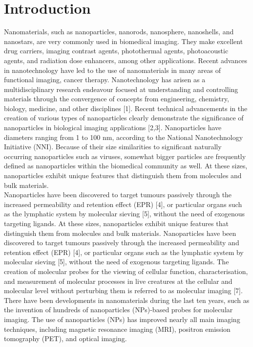 \documentclass[12pt]{article}
\begin{document}
\section*{Introduction}
Nanomaterials, such as nanoparticles, nanorods, nanosphere, nanoshells, and nanostars, are very commonly used in biomedical imaging. They make excellent drug carriers, imaging contrast agents, photothermal agents, photoacoustic agents, and radiation dose enhancers, among other applications. Recent advances in nanotechnology have led to the use of nanomaterials in many areas of functional imaging, cancer therapy. Nanotechnology has arisen as a multidisciplinary research endeavour focused at understanding and controlling materials through the convergence of concepts from engineering, chemistry, biology, medicine, and other disciplines [1]. Recent technical advancements in the creation of various types of nanoparticles clearly demonstrate the significance of nanoparticles in biological imaging applications [2,3]. Nanoparticles have diameters ranging from 1 to 100 nm, according to the National Nanotechnology Initiative (NNI). Because of their size similarities to significant naturally occurring nanoparticles such as viruses, somewhat bigger particles are frequently defined as nanoparticles within the biomedical community as well. At these sizes, nanoparticles exhibit unique features that distinguish them from molecules and bulk materials.\\ Nanoparticles have been discovered to target tumours passively through the increased permeability and retention effect (EPR) [4], or particular organs such as the lymphatic system by molecular sieving [5], without the need of exogenous targeting ligands. At these sizes, nanoparticles exhibit unique features that distinguish them from molecules and bulk materials. Nanoparticles have been discovered to target tumours passively through the increased permeability and retention effect (EPR) [4], or particular organs such as the lymphatic system by molecular sieving [5], without the need of exogenous targeting ligands. The creation of molecular probes for the viewing of cellular function, characterisation, and measurement of molecular processes in live creatures at the cellular and molecular level without perturbing them is referred to as molecular imaging [7]. There have been developments in nanomaterials during the last ten years, such as the invention of hundreds of nanoparticles (NPs)-based probes for molecular imaging.
The use of nanoparticles (NPs) has improved nearly all main imaging techniques, including magnetic resonance imaging (MRI), positron emission tomography (PET), and optical imaging. 
\end{document}
